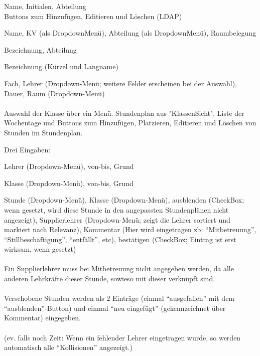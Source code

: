 \begin{description}[style=nextline]
	\item[Lehrer]
		Name, Initialen, Abteilung\\
		Buttons zum Hinzufügen, Editieren und Löschen (LDAP)
	\item[Klassen]
		Name, KV (als Dropdown­Menü), Abteilung (als Dropdown­Menü), Raumbelegung
	\item[Räume]
		Bezeichnung, Abteilung
	\item[Fächer]
		Bezeichnung (Kürzel und Langname)
	\item[Stunden(-pläne)]
		Fach, Lehrer (Dropdown-­Menü; weitere Felder erscheinen bei der Auswahl), Dauer, Raum (Dropdown-­Menü)\\
		\\
		Auswahl der Klasse über ein Menü. Stundenplan aus "Klassen­Sicht". Liste der Wochentage und Buttons zum Hinzufügen, Platzieren, Editieren und Löschen von Stunden im Stundenplan.
	\item[Supplierungen]
		Drei Eingaben:
		\begin{description}[style=nextline]
			\item[fehlende Lehrer]
				Lehrer (Dropdown­-Menü), von­-bis, Grund
			\item[fehlende Klassen]
				Klasse (Dropdown­-Menü), von­-bis, Grund
			\item[Supplierungen]
				Stunde (Dropdown­-Menü), Klasse (Dropdown-­Menü), ausblenden (Check­Box; wenn gesetzt, wird diese Stunde in den angepassten Stundenplänen nicht angezeigt), Supplierlehrer (Dropdown-­Menü; zeigt die Lehrer sortiert und markiert nach Relevanz), Kommentar (Hier wird eingetragen zb: \enquote{Mitbetreuung}, \enquote{Stillbeschäftigung}, \enquote{entfällt}, etc), bestätigen (Check­Box; Eintrag ist erst wirksam, wenn gesetzt)\\
			\\
			Ein Supplierlehrer muss bei Mitbetreuung nicht angegeben werden, da alle anderen Lehrkräfte dieser Stunde, so­wie­so mit dieser verknüpft sind.\\
			\\
			Verschobene Stunden werden als 2 Einträge (einmal \enquote{ausgefallen} mit dem \enquote{ausblenden}-­Button) und einmal \enquote{neu eingefügt} (gekennzeichnet über Kommentar) eingegeben.\\
			\\
			(ev. falls noch Zeit: Wenn ein fehlender Lehrer eingetragen wurde, so werden automatisch alle \enquote{Kollisionen} angezeigt.)

\end{description}
\end{description}

